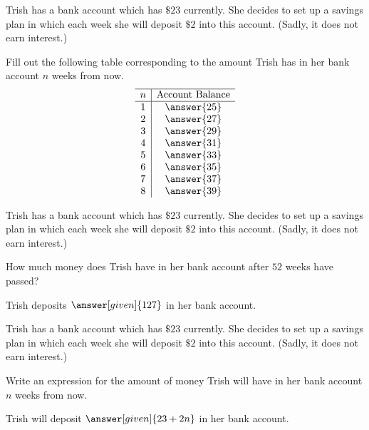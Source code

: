 \documentclass[nooutcomes]{ximera}
\begin{document}
\begin{problem}
Trish has a bank account which has $\$23$ currently.  She decides to set up a savings plan in which each week she will deposit $\$2$ into this account. (Sadly, it does not earn interest.)

Fill out the following table corresponding to the amount Trish has in her bank account $n$ weeks from now.
\[
\begin{array}{c|c} \hline
n & \text{Account Balance} \\ \hline
1 & \answer{25} \\
2 & \answer{27} \\
3 & \answer{29}\\
4 & \answer{31}\\
5 & \answer{33}\\
6 & \answer{35}\\
7 & \answer{37}\\
8 & \answer{39}\\
\end{array}
\]
\end{problem}



\begin{problem}
Trish has a bank account which has $\$23$ currently.  She decides to set up a savings plan in which each week she will deposit $\$2$ into this account. (Sadly, it does not earn interest.)

How much money does Trish have in her bank account after $52$ weeks have passed?

\begin{prompt}
Trish deposits $\answer[given]{127}$ in her bank account.
\end{prompt}
\end{problem}




\begin{problem}
Trish has a bank account which has $\$23$ currently.  She decides to set up a savings plan in which each week she will deposit $\$2$ into this account. (Sadly, it does not earn interest.)

Write an expression for the amount of money Trish will have in her bank account $n$ weeks from now.

\begin{prompt}
Trish will deposit $\answer[given]{23+2n}$ in her bank account.
\end{prompt}
\end{problem}
\end{document}
